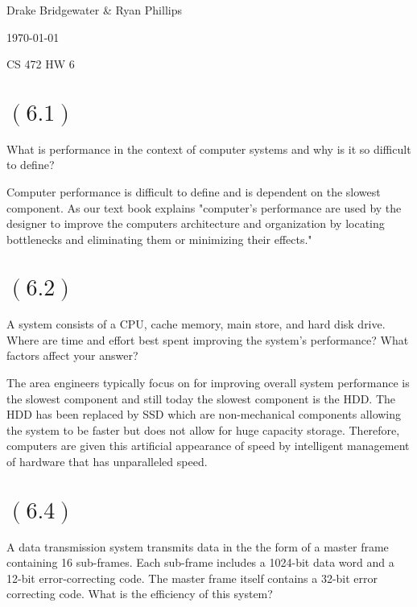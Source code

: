 \documentclass[letterpaper,12pt,titlepage]{article}
\def\name{Drake Bridgewater \& Ryan Phillips}
\begin{document}
\hfill \name

\hfill \today

\hfill CS 472 HW 6

\section*{$(6.1)$} What is performance in the context of computer systems and why is it so difficult to define?

\begin{mdframed}[style=MyFrame]
Computer performance is difficult to define and is dependent on the slowest component. As our text book explains "computer's performance are used by the designer to improve the computers architecture and organization by locating bottlenecks and eliminating them or minimizing their effects." \cite{Clements}
\end{mdframed}

\section*{$(6.2)$} A system consists of a CPU, cache memory, main store, and hard disk drive. Where are time and effort best spent improving the system's performance? What factors affect your answer?

\begin{mdframed}[style=MyFrame]
The area engineers typically focus on for improving overall system performance is the slowest component and still today the slowest component is the HDD. The HDD has been replaced by SSD which are non-mechanical components allowing the system to be faster but does not allow for huge capacity storage. Therefore, computers are given this artificial appearance of speed by intelligent management of hardware that has unparalleled speed.
\end{mdframed}

\section*{$(6.4)$} A data transmission system transmits data in the the form of a master frame containing 16 sub-frames. Each sub-frame includes a 1024-bit data word and a 12-bit error-correcting code. The master frame itself contains a 32-bit error correcting code. What is the efficiency of this system?

\begin{mdframed}[style=MyFrame]
\end{mdframed}
\end{document}
